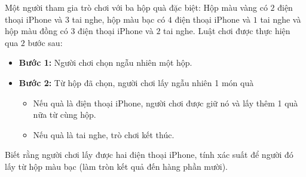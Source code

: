 \begin{bt}%
	Một người tham gia  trò chơi với ba hộp quà đặc biệt: Hộp màu vàng có $2$ điện thoại iPhone và $3$ tai nghe, hộp màu bạc có $4$ điện thoại iPhone và $1$ tai nghe và hộp màu đồng có $3$ điện thoại iPhone và $2$ tai nghe. Luật chơi được thực hiện qua $2$ bước sau:
	\begin{itemize}
		\item \textbf{Bước 1:} Người chơi chọn ngẫu nhiên một  hộp.
		\item \textbf{Bước 2:} Từ hộp đã chọn, người chơi lấy  ngẫu nhiên 1 món quà
		\begin{itemize}
			\item  Nếu quà là điện thoại iPhone, người chơi được giữ nó và lấy thêm 1 quà nữa từ cùng hộp.
			\item Nếu quà là tai nghe, trò  chơi kết thúc.
		\end{itemize}
	\end{itemize}
	Biết rằng người chơi lấy được hai điện thoại iPhone, tính xác suất để người đó lấy từ hộp màu  bạc (làm tròn kết quả đến hàng phần mười).
\end{bt}

